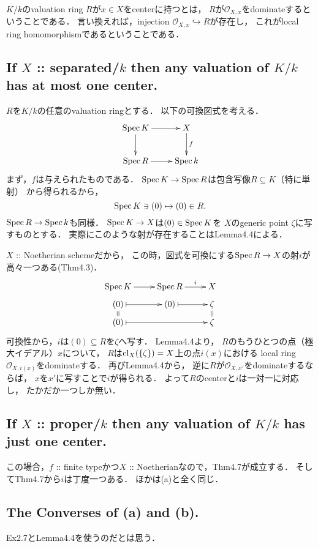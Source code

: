 \documentclass[a4paper]{jsarticle}
\newcommand{\shO}{\mathcal{O}}
\begin{document}
    $K/k$のvaluation ring $R$が$x \in X$をcenterに持つとは，
    $R$が$\shO_{X,x}$をdominateするということである．
    言い換えれば，injection $\shO_{X,x} \hookrightarrow R$が存在し，
    これがlocal ring homomorphismであるということである．

    \subsection{If $X$ :: separated/$k$ then any valuation of $K/k$ has at most one center.}
    $R$を$K/k$の任意のvaluation ringとする．
    以下の可換図式を考える．
    \[
    \xymatrix
    {
        \Spec K \ar[d] \ar[r]& X \ar[d]^-{f} \\
        \Spec R \ar[r] & \Spec k
    }
    \]
    まず，$f$は与えられたものである．
    $\operatorname{Spec} K \to \operatorname{Spec} R$は包含写像$R \subseteq K$（特に単射）
    から得られるから，
    \[ \operatorname{Spec} K \ni (0) \mapsto (0) \in R. \]
    $\operatorname{Spec} R \to \operatorname{Spec} k$も同様．
    $\operatorname{Spec} K \to X$は$(0) \in \operatorname{Spec} K$を
    $X$のgeneric point $\zeta$に写すものとする．
    実際にこのような射が存在することはLemma4.4による．

    $X$ :: Noetherian schemeだから，
    この時，図式を可換にする$\operatorname{Spec} R \to X$の射$i$が高々一つある(Thm4.3)．
    \[
        \xymatrix@R=5pt
        {
            \Spec K \ar[r]& \Spec R \ar[r]^-{i}& X \\
            (0) \ar@{|->}[r]& (0) \ar@{|->}[r]& \zeta \\
            (0) \ar@{=}[u] \ar@{|->}[rr]& & \zeta \ar@{=}[u]
        }
    \]
    可換性から，$i$は$(0) \subseteq R$を$\zeta$へ写す．
    Lemma4.4より，
    $R$のもうひとつの点（極大イデアル）$x$について，
    $R$は$\operatorname{cl}_X(\{\zeta\})=X$上の点$i(x)$における
    local ring $\shO_{X,i(x)}$をdominateする．
    再びLemma4.4から，
    逆に$R$が$\shO_{X,x'}$をdominateするならば，
    $x$を$x'$に写すことで$i$が得られる．
    よって$R$のcenterと$i$は一対一に対応し，
    たかだか一つしか無い．

    \subsection{If $X$ :: proper/$k$ then any valuation of $K/k$ has just one center.}
    この場合，$f$ :: finite typeかつ$X$ :: Noetherianなので，Thm4.7が成立する．
    そしてThm4.7から$i$は丁度一つある．
    ほかは(a)と全く同じ．

    \subsection{The Converses of (a) and (b).}
    Ex2.7とLemma4.4を使うのだとは思う．
\end{document}
